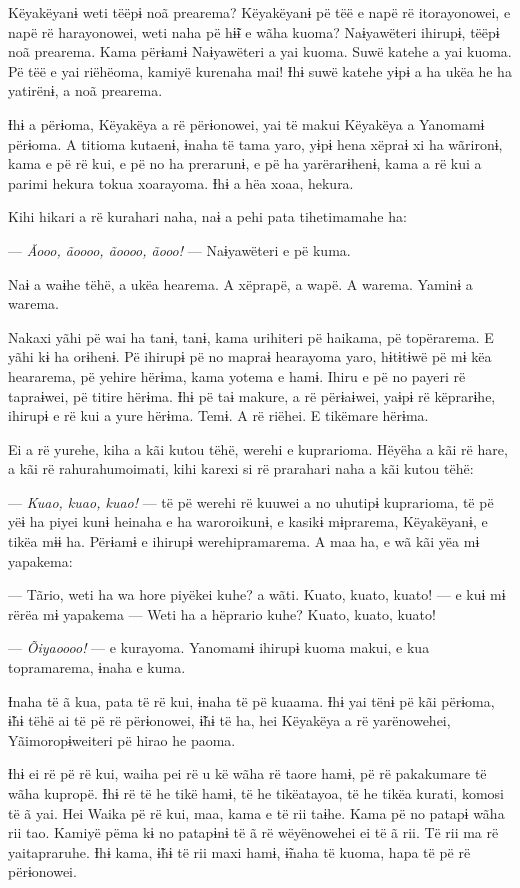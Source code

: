 Këyakëyanɨ weti tëëpɨ noã prearema? Këyakëyanɨ pë tëë e napë rë
itorayonowei, e napë rë harayonowei, weti naha pë hɨ̃ɨ e wãha kuoma?
Naɨyawëteri ihirupɨ, tëëpɨ noã prearema. Kama përɨamɨ Naɨyawëteri a yai
kuoma. Suwë katehe a yai kuoma. Pë tëë e yai riëhëoma, kamiyë kurenaha
mai! Ɨhɨ suwë katehe yɨpɨ a ha ukëa he ha yatirënɨ, a noã prearema. 

Ɨhɨ a përɨoma, Këyakëya a rë përɨonowei, yai të makui Këyakëya a
Yanomamɨ përɨoma. A titioma kutaenɨ, ɨnaha të tama yaro, yɨpɨ hena
xëpraɨ xi ha wãrironɨ, kama e pë rë kui, e pë no ha prerarunɨ, e pë ha
yarërarɨhenɨ, kama a rë kui a parimi hekura tokua xoarayoma. Ɨhɨ a hëa
xoaa, hekura. 

Kihi hikari a rë kurahari naha, naɨ a pehi pata tihetimamahe ha:

--- \textit{Ãooo, ãoooo, ãoooo, ãooo!} --- Naɨyawëteri e pë kuma. 

Naɨ a waɨhe tëhë, a ukëa hearema. A xëprapë, a wapë. A warema. Yaminɨ a
warema. 

Nakaxi yãhi pë wai ha tanɨ, tanɨ, kama urihiteri pë haikama, pë
topërarema. E yãhi kɨ ha orɨhenɨ. Pë ihirupɨ pë no mapraɨ hearayoma
yaro, hɨtɨtɨwë pë mɨ këa heararema, pë yehire hërɨma, kama yotema e
hamɨ. Ihiru e pë no payeri rë tapraɨwei, pë titire hërɨma. Ɨhɨ pë taɨ
makure, a rë përɨaɨwei, yaɨpɨ rë këprarɨhe, ihirupɨ e rë kui a yure
hërɨma. Temɨ. A rë riëhei. E tikëmare hërɨma. 

Ei a rë yurehe, kiha a kãi kutou tëhë, werehi e kuprarioma. Hëyëha a kãi
rë hare, a kãi rë rahurahumoimati, kihi karexi si rë prarahari naha a
kãi kutou tëhë: 

--- \textit{Kuao, kuao, kuao!} --- të pë werehi rë kuuwei a no uhutipɨ
kuprarioma, të pë yëɨ ha piyei kunɨ heinaha e ha waroroikunɨ, e kasikɨ
mɨprarema, Këyakëyanɨ, e tikëa mɨɨ ha. Përɨamɨ e ihirupɨ
werehipramarema. A maa ha, e wã kãi yëa mɨ yapakema: 

--- Tãrio, weti ha wa hore piyëkei kuhe? a wãti. Kuato, kuato, kuato!
--- e kuɨ mɨ rërëa mɨ yapakema --- Weti ha a hëprario kuhe? Kuato,
kuato, kuato! 

--- \textit{Õiyaoooo!} --- e kurayoma. Yanomamɨ ihirupɨ kuoma makui, e kua
topramarema, ɨnaha e kuma. 

Ɨnaha të ã kua, pata të rë kui, ɨnaha të pë kuaama. Ɨhɨ yai tënɨ pë kãi
përɨoma, ɨ̃hɨ tëhë ai të pë rë përɨonowei, ɨ̃hɨ të ha, hei Këyakëya a rë
yarënowehei, Yãimoropɨweiteri pë hirao he paoma. 

Ɨhɨ ei rë pë rë kui, waiha pei rë u kë wãha rë taore hamɨ, pë rë
pakakumare të wãha kupropë. Ɨhɨ rë të he tikë hamɨ, të he tikëatayoa, të
he tikëa kurati, komosi të ã yai. Hei Waika pë rë kui, maa, kama e të
rii taɨhe. Kama pë no patapɨ wãha rii tao. Kamiyë pëma kɨ no patapɨnɨ të
ã rë wëyënowehei ei të ã rii. Të rii ma rë yaitapraruhe. Ɨhɨ kama, ɨ̃hɨ
të rii maxi hamɨ, ɨ̃naha të kuoma, hapa të pë rë përɨonowei. 

